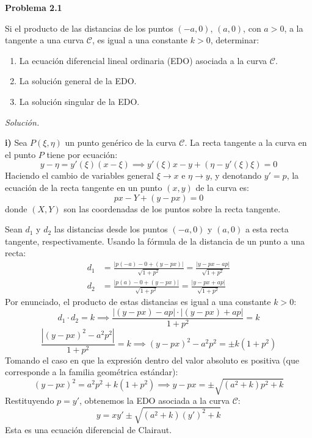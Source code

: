 \documentclass[12pt,letterpaper]{article}
\begin{document}
\textbf{Problema 2.1}

\medskip
Si el producto de las distancias de los puntos $(-a, 0)$, $(a, 0)$, con $a > 0$, a la tangente a una curva $\mathcal{C}$, es igual a una constante $k > 0$, determinar:
\begin{enumerate}[label=\roman*.-]
  \item La ecuación diferencial lineal ordinaria (EDO) asociada a la curva $\mathcal{C}$.
  \item La solución general de la EDO.
  \item La solución singular de la EDO.
\end{enumerate}

\medskip
\textit{Solución.}

\textbf{i)} Sea $P(\xi, \eta)$ un punto genérico de la curva $\mathcal{C}$. La recta tangente a la curva en el punto $P$ tiene por ecuación:
\[
  y - \eta = y'(\xi)(x - \xi) \implies y'(\xi)x - y + (\eta - y'(\xi)\xi) = 0
\]
Haciendo el cambio de variables general $\xi \to x$ e $\eta \to y$, y denotando $y' = p$, la ecuación de la recta tangente en un punto $(x,y)$ de la curva es:
\[
  px - Y + (y - px) = 0
\]
donde $(X,Y)$ son las coordenadas de los puntos sobre la recta tangente.

Sean $d_1$ y $d_2$ las distancias desde los puntos $(-a,0)$ y $(a,0)$ a esta recta tangente, respectivamente. Usando la fórmula de la distancia de un punto a una recta:
\begin{align*}
  d_1 &= \frac{|p(-a) - 0 + (y - px)|}{\sqrt{1 + p^2}} = \frac{|y - px - ap|}{\sqrt{1 + p^2}} \\
  d_2 &= \frac{|p(a) - 0 + (y - px)|}{\sqrt{1 + p^2}} = \frac{|y - px + ap|}{\sqrt{1 + p^2}}
\end{align*}
Por enunciado, el producto de estas distancias es igual a una constante $k > 0$:
\[
  d_1 \cdot d_2 = k \implies \frac{|(y - px) - ap| \cdot |(y - px) + ap|}{1 + p^2} = k
\]
\[
  \frac{|(y - px)^2 - a^2 p^2|}{1 + p^2} = k \implies (y - px)^2 - a^2 p^2 = \pm k(1 + p^2)
\]
Tomando el caso en que la expresión dentro del valor absoluto es positiva (que corresponde a la familia geométrica estándar):
\[
  (y - px)^2 = a^2 p^2 + k(1 + p^2) \implies y - px = \pm \sqrt{(a^2 + k)p^2 + k}
\]
Restituyendo $p = y'$, obtenemos la EDO asociada a la curva $\mathcal{C}$:
\[
  y = xy' \pm \sqrt{(a^2 + k)(y')^2 + k}
\]
Esta es una ecuación diferencial de Clairaut.
\end{document}
